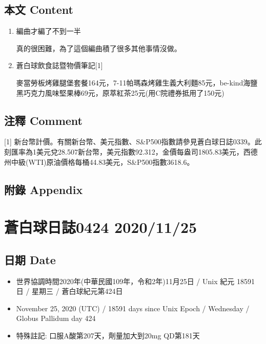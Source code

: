 \documentclass[
]{article}
\providecommand{\tightlist}{%
  \setlength{\itemsep}{0pt}\setlength{\parskip}{0pt}}
\begin{document}
\hypertarget{ux672cux6587-content-75}{%
\subsection{本文 Content}\label{ux672cux6587-content-75}}

\begin{enumerate}
\def\labelenumi{\arabic{enumi}.}
\item
  編曲才編了不到一半

  真的很困難，為了這個編曲積了很多其他事情沒做。
\item
  蒼白球飲食誌暨物價筆記{[}1{]}

  麥當勞板烤雞腿堡套餐164元，7-11帕瑪森烤雞生義大利麵85元，be-kind海鹽黑巧克力風味堅果棒69元，原萃紅茶25元(用C院禮券抵用了150元)
\end{enumerate}

\hypertarget{ux6ce8ux91cb-comment-75}{%
\subsection{注釋 Comment}\label{ux6ce8ux91cb-comment-75}}

{[}1{]}
新台幣計價。有關新台幣、美元指數、S\&P500指數請參見蒼白球日誌0339。此刻匯率為1美元兌28.507新台幣，美元指數92.312，金價每盎司1805.83美元，西德州中級(WTI)原油價格每桶44.83美元，S\&P500指數3618.6。

\hypertarget{ux9644ux9304-appendix-75}{%
\subsection{附錄 Appendix}\label{ux9644ux9304-appendix-75}}

\hypertarget{ux84bcux767dux7403ux65e5ux8a8c0424-20201125}{%
\section{蒼白球日誌0424
2020/11/25}\label{ux84bcux767dux7403ux65e5ux8a8c0424-20201125}}

\hypertarget{ux65e5ux671f-date-76}{%
\subsection{日期 Date}\label{ux65e5ux671f-date-76}}

\begin{itemize}
\tightlist
\item
  世界協調時間2020年(中華民國109年，令和2年)11月25日 / Unix 紀元 18591
  日 / 星期三 / 蒼白球紀元第424日
\item
  November 25, 2020 (UTC) / 18591 days since Unix Epoch / Wednesday /
  Globus Pallidum day 424
\item
  特殊註記: 口服A酸第207天，劑量加大到20mg QD第181天
\end{itemize}
\end{document}
